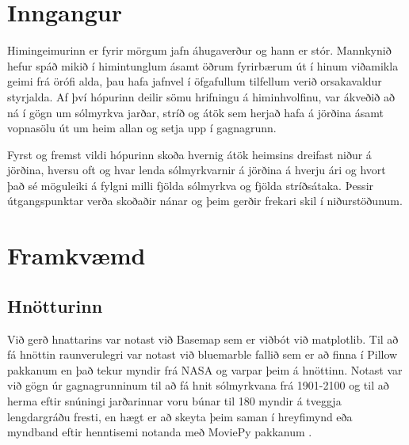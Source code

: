 \documentclass[12pt, git, final]{rureport}
\begin{document}
\maketitle  %


%
\section{Inngangur} %
Himingeimurinn er fyrir mörgum jafn áhugaverður og hann er stór. Mannkynið hefur spáð mikið í himintunglum ásamt öðrum fyrirbærum út í hinum viðamikla geimi frá örófi alda, þau hafa jafnvel í öfgafullum tilfellum verið orsakavaldur styrjalda. Af því hópurinn deilir sömu hrifningu á himinhvolfinu, var ákveðið að ná í gögn um sólmyrkva jarðar, stríð og átök sem herjað hafa á jörðina ásamt vopnasölu út um heim allan og setja upp í gagnagrunn. 

Fyrst og fremst vildi hópurinn skoða hvernig átök heimsins dreifast niður á jörðina, hversu oft og hvar lenda sólmyrkvarnir á jörðina á hverju ári og hvort það sé möguleiki á fylgni milli fjölda sólmyrkva og fjölda stríðsátaka. Þessir útgangspunktar verða skoðaðir nánar og þeim gerðir frekari skil í niðurstöðunum.  
\section{Framkvæmd}
\subsection{Hnötturinn}
Við gerð hnattarins var notast við Basemap \cite{basemap} sem er viðbót við matplotlib. Til að fá hnöttin raunverulegri var notast við bluemarble fallið sem er að finna í Pillow \cite{pillow} pakkanum en það tekur myndir frá NASA \cite{bluemarble} og varpar þeim á hnöttinn. Notast var við gögn úr gagnagrunninum til að fá hnit sólmyrkvana frá 1901-2100 og til að herma eftir snúningi jarðarinnar voru búnar til 180 myndir á tveggja lengdargráðu fresti, en hægt er að skeyta þeim saman í hreyfimynd eða myndband eftir henntisemi notanda með MoviePy pakkanum \cite{moviepy}.
 
\end{document}
